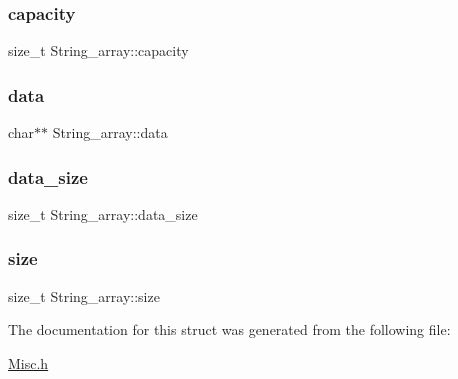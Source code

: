 \subsubsection{\texorpdfstring{capacity}{capacity}}
{\footnotesize\ttfamily size\+\_\+t String\+\_\+array\+::capacity}

\mbox{\label{structString__array_afbe749a8998c54158933158ebc48dce9_afbe749a8998c54158933158ebc48dce9}} 
\subsubsection{\texorpdfstring{data}{data}}
{\footnotesize\ttfamily char$\ast$$\ast$ String\+\_\+array\+::data}

\mbox{\label{structString__array_a9acda89272e9c00036c20f0643aa81e1_a9acda89272e9c00036c20f0643aa81e1}} 
\subsubsection{\texorpdfstring{data\+\_\+size}{data\_size}}
{\footnotesize\ttfamily size\+\_\+t String\+\_\+array\+::data\+\_\+size}

\mbox{\label{structString__array_afe557fc0c5136ee70c765ba49513c098_afe557fc0c5136ee70c765ba49513c098}} 
\subsubsection{\texorpdfstring{size}{size}}
{\footnotesize\ttfamily size\+\_\+t String\+\_\+array\+::size}



The documentation for this struct was generated from the following file\+:\begin{DoxyCompactItemize}
\item 
\hyperlink{Misc_8h}{Misc.\+h}\end{DoxyCompactItemize}
